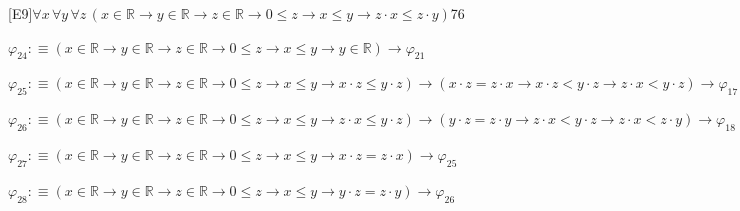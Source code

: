 \begin{fullproof}{[E9]}{$\forall x\,\forall y\,\forall z\,(x \in \mathbb{R} \to y \in \mathbb{R} \to z \in \mathbb{R} \to 0 \leq z \to x \leq y \to z \cdot x \leq z \cdot y)$}{76}
\begin{abbrevlist}
\item $\varphi_{24} :\equiv (x \in \mathbb{R} \to y \in \mathbb{R} \to z \in \mathbb{R} \to 0 \leq z \to x \leq y \to y \in \mathbb{R}) \to \varphi_{21}$
\item $\varphi_{25} :\equiv (x \in \mathbb{R} \to y \in \mathbb{R} \to z \in \mathbb{R} \to 0 \leq z \to x \leq y \to x \cdot z \leq y \cdot z) \to (x \cdot z = z \cdot x \to x \cdot z < y \cdot z \to z \cdot x < y \cdot z) \to \varphi_{17}$
\item $\varphi_{26} :\equiv (x \in \mathbb{R} \to y \in \mathbb{R} \to z \in \mathbb{R} \to 0 \leq z \to x \leq y \to z \cdot x \leq y \cdot z) \to (y \cdot z = z \cdot y \to z \cdot x < y \cdot z \to z \cdot x < z \cdot y) \to \varphi_{18}$
\item $\varphi_{27} :\equiv (x \in \mathbb{R} \to y \in \mathbb{R} \to z \in \mathbb{R} \to 0 \leq z \to x \leq y \to x \cdot z = z \cdot x) \to \varphi_{25}$
\item $\varphi_{28} :\equiv (x \in \mathbb{R} \to y \in \mathbb{R} \to z \in \mathbb{R} \to 0 \leq z \to x \leq y \to y \cdot z = z \cdot y) \to \varphi_{26}$
\end{abbrevlist}
\end{fullproof}
